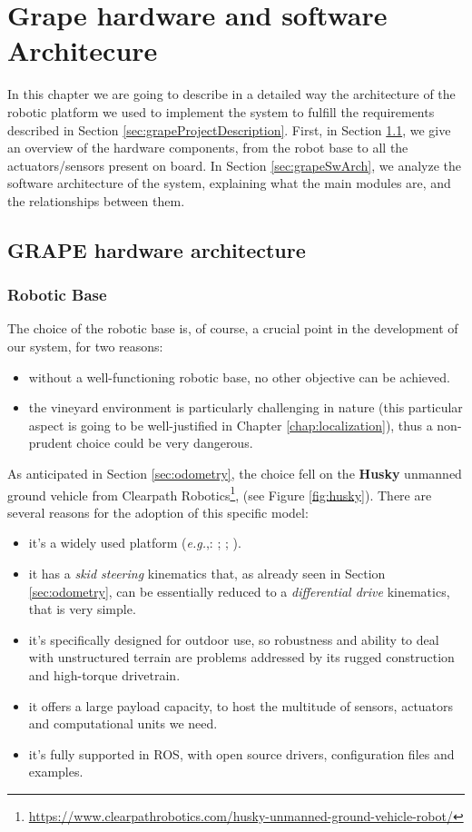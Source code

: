 
\chapter{Grape hardware and software Architecure} \label{chap:grapeSoftwareArchitecture}

In this chapter we are going to describe in a detailed way the architecture of the robotic platform we used to implement the system to fulfill the requirements described in Section \ref{sec:grapeProjectDescription}. First, in Section \ref{sec:grapeHwArch}, we give an overview of the hardware components, from the robot base to all the actuators/sensors present on board. In Section \ref{sec:grapeSwArch}, we analyze the software architecture of the system, explaining what the main modules are, and the relationships between them.

\section{GRAPE hardware architecture}\label{sec:grapeHwArch}

\subsection{Robotic Base}
The choice of the robotic base is, of course, a crucial point in the development of our system, for two reasons:
\begin{itemize}
	\item without a well-functioning robotic base, no other objective can be achieved.
	\item the vineyard environment is particularly challenging in nature (this particular aspect is going to be well-justified in Chapter \ref{chap:localization}), thus a non-prudent choice could be very dangerous.
\end{itemize}
As anticipated in Section \ref{sec:odometry}, the choice fell on the \textbf{Husky} unmanned ground vehicle from Clearpath Robotics\footnote{\url{https://www.clearpathrobotics.com/husky-unmanned-ground-vehicle-robot/}},
(see Figure \ref{fig:husky}). There are several reasons for the adoption of this specific model:
\begin{itemize}
	\item it's a widely used platform (\textit{e.g.},: \cite{husky1}; \cite{husky2}; \cite{husky3}).
	\item it has a \textit{skid steering} kinematics that, as already seen in Section \ref{sec:odometry}, can be essentially reduced to a \textit{differential drive} kinematics, that is very simple.
	\item it's specifically designed for outdoor use, so robustness and ability to deal with unstructured terrain are problems addressed by its rugged construction and high-torque drivetrain.
	\item it offers a large payload capacity, to host the multitude of sensors, actuators and computational units we need.
	\item it's fully supported in \ac{ROS}, with open source drivers, configuration files and examples.
\end{itemize}

